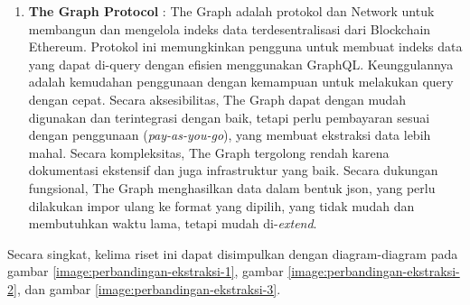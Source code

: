 \begin{enumerate}
    \item \textbf{The Graph Protocol} \parencite{TheGraphDocs}: The Graph adalah protokol dan Network untuk membangun dan mengelola indeks data terdesentralisasi dari Blockchain Ethereum. Protokol ini memungkinkan pengguna untuk membuat indeks data yang dapat di-query dengan efisien menggunakan GraphQL. Keunggulannya adalah kemudahan penggunaan dengan kemampuan untuk melakukan query dengan cepat. Secara aksesibilitas, The Graph dapat dengan mudah digunakan dan terintegrasi dengan baik, tetapi perlu pembayaran sesuai dengan penggunaan (\textit{pay-as-you-go}), yang membuat ekstraksi data lebih mahal. Secara kompleksitas, The Graph tergolong rendah karena dokumentasi ekstensif dan juga infrastruktur yang baik. Secara dukungan fungsional, The Graph menghasilkan data dalam bentuk json, yang perlu dilakukan impor ulang ke format yang dipilih, yang tidak mudah dan membutuhkan waktu lama, tetapi mudah di-\textit{extend}.
\end{enumerate}

Secara singkat, kelima riset ini dapat disimpulkan dengan diagram-diagram pada gambar \ref{image:perbandingan-ekstraksi-1}, gambar \ref{image:perbandingan-ekstraksi-2}, dan gambar \ref{image:perbandingan-ekstraksi-3}.

\newpage

